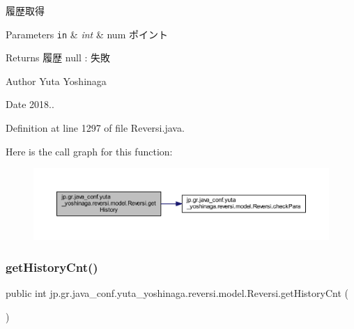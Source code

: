 履歴取得 


\begin{DoxyParams}[1]{Parameters}
\mbox{\tt in}  & {\em int} & num ポイント \\
\hline
\end{DoxyParams}
\begin{DoxyReturn}{Returns}
履歴 null \+: 失敗 
\end{DoxyReturn}
\begin{DoxyAuthor}{Author}
Yuta Yoshinaga 
\end{DoxyAuthor}
\begin{DoxyDate}{Date}
2018.. 
\end{DoxyDate}


Definition at line 1297 of file Reversi.\+java.

Here is the call graph for this function\+:
\nopagebreak
\begin{figure}[H]
\begin{center}
\leavevmode
\includegraphics[width=350pt]{classjp_1_1gr_1_1java__conf_1_1yuta__yoshinaga_1_1reversi_1_1model_1_1_reversi_af781f5ebb4fb33b574ec58acfb45a796_cgraph}
\end{center}
\end{figure}
\mbox{\label{classjp_1_1gr_1_1java__conf_1_1yuta__yoshinaga_1_1reversi_1_1model_1_1_reversi_a286949e070d0cfc8a1d9562a298b7b98}} 
\subsubsection{\texorpdfstring{get\+History\+Cnt()}{getHistoryCnt()}}
{\footnotesize\ttfamily public int jp.\+gr.\+java\+\_\+conf.\+yuta\+\_\+yoshinaga.\+reversi.\+model.\+Reversi.\+get\+History\+Cnt (\begin{DoxyParamCaption}{ }\end{DoxyParamCaption})}



